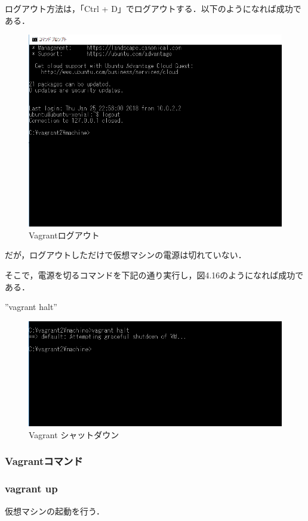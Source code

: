 ログアウト方法は，「Ctrl + D」でログアウトする．以下のようになれば成功である．
\begin{figure}[htb]
\centering
\includegraphics[width=13cm]{4-15.png}
\caption{Vagrantログアウト}\label{4-15}
\end{figure}
\newpage

だが，ログアウトしただけで仮想マシンの電源は切れていない．

そこで，電源を切るコマンドを下記の通り実行し，図4.16のようになれば成功である．

”vagrant halt”

\begin{figure}[htb]
\centering
\includegraphics[width=13cm]{4-16.png}
\caption{Vagrant シャットダウン}\label{4-16}
\end{figure}
\newpage

\subsubsection{Vagrantコマンド}

\subsubsection{vagrant up}
仮想マシンの起動を行う．

